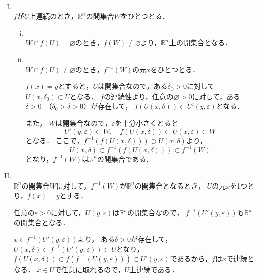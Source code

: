 \begin{tproof} \mbox{　}
    \begin{enumerate}[(I)]
        \item \mbox{} \\
              $f$が$U$上連続のとき，$\mathbb{R}^n$の開集合$W$をひとつとる．
              \begin{enumerate}[(i)]
                  \item \mbox{} \\
                        $ W \cap f(U) = \varnothing$のとき，$f(W) \ne \varnothing$より，$\mathbb{R}^n$上の開集合となる．
                  \item \mbox{} \\
                        $ W \cap f(U) \ne \varnothing$のとき，$f^{-1} (W)$の元$x$をひとつとる．

                        $ f(x)=y$とすると，$U$は開集合なので，ある$\delta_0 >0$に対して$U(x,\delta_0) \subset U$となる．
                        $f$の連続性より，任意の$\varnothing >0$に対して，ある$\delta >0$~（$\delta_0 >\delta >0$）が存在して，
                        $f(U(x,\delta)) \subset U' (y,\varepsilon)$となる．

                        また， $W$は開集合なので，$\varepsilon$を十分小さくとると
                        \[
                            U'(y,\varepsilon) \subset W,\quad f(U(x,\delta)) \subset U (x,\varepsilon) \subset W
                        \]
                        となる．
                        ここで，$f^{-1} (f(U(x,\delta))) \supset U(x,\delta)$より，
                        \[
                            U(x,\delta) \subset f^{-1} (f(U(x,\delta))) \subset f^{-1} (W)
                        \]
                        となり，$f^{-1} (W)$は$\mathbb{R}^n$の開集合である．
              \end{enumerate}
        \item \mbox{} \\
              $ \mathbb{R}^n$の開集合$W$に対して，$f^{-1} (W)$が$\mathbb{R}^n$の開集合となるとき，
              $U$の元$x$を1つとり，$f(x)=y$とする．

              任意の$\varepsilon >0$に対して，$U(y,\varepsilon)$は$\mathbb{R}^n$の開集合なので，
              $f^{-1} (U'(y,\varepsilon))$も$\mathbb{R}^n$の開集合となる．

              $x \in f^{-1} (U'(y,\varepsilon))$より，
              ある$\delta >0$が存在して，$U(x,\delta) \subset  f^{-1}(U'(y,\varepsilon)) \subset U$となり，
              $f(U(x,\delta)) \subset f(f^{-1}(U(y,\varepsilon))) \subset U'(y,\varepsilon)$であるから，$f$は$x$で連続となる．
              $x \in U$で任意に取れるので，$U$上連続である．
    \end{enumerate}
\end{tproof}
\newpage


